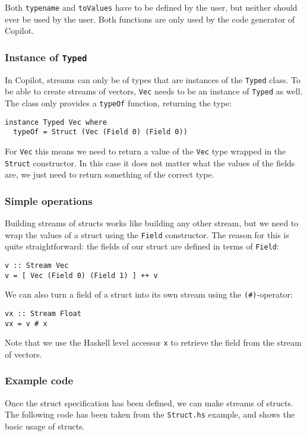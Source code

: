 Both \texttt{typename} and \texttt{toValues} have to be defined by the user,
but neither should ever be used by the user. Both functions are only used by
the code generator of Copilot.


\subsubsection*{Instance of \texttt{Typed}}
In Copilot, streams can only be of types that are instances of the \texttt{Typed}
class. To be able to create streams of vectors, \texttt{Vec} needs to be an
instance of \texttt{Typed} as well. The class only provides a \texttt{typeOf}
function, returning the type:
\begin{lstlisting}[language=Copilot]
instance Typed Vec where
  typeOf = Struct (Vec (Field 0) (Field 0))
\end{lstlisting}
For \texttt{Vec} this means we need to return a value of the \texttt{Vec}
type wrapped in the \texttt{Struct} constructor. In this case it does not
matter what the values of the fields are, we just need to return something of
the correct type.


\subsubsection*{Simple operations}
Building streams of structs works like building any other stream, but we need
to wrap the values of a struct using the \texttt{Field} constructor. The reason
for this is quite straightforward: the fields of our struct are defined in
terms of \texttt{Field}:
\begin{lstlisting}[language=Copilot]
v :: Stream Vec
v = [ Vec (Field 0) (Field 1) ] ++ v
\end{lstlisting}

We can also turn a field of a struct into its own stream using the
\texttt{(\#)}-operator:
\begin{lstlisting}[language=Copilot]
vx :: Stream Float
vx = v # x
\end{lstlisting}
Note that we use the Haskell level accessor \texttt{x} to retrieve the field
from the stream of vectors.


\subsubsection*{Example code}
\label{exm:struct}
Once the struct specification has been defined, we can make streams of structs. The following
code has been taken from the \texttt{Struct.hs} example, and shows the basic
usage of structs.
%

%

